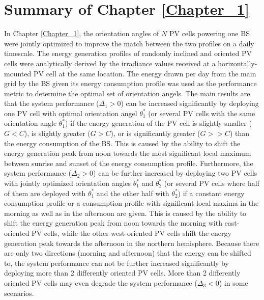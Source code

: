 \section{Summary of Chapter \ref{Chapter_1}\label{sum_Chapter_1}}
In Chapter \ref{Chapter_1}, the orientation angles of $N$ PV cells powering one BS were jointly optimized to improve the match between the two profiles on a daily timescale. The energy generation profiles of randomly inclined and oriented PV cells were analytically derived by the irradiance values received at a horizontally-mounted PV cell at the same location. The energy drawn per day from the main grid by the BS given its energy consumption profile was used as the performance metric to determine the optimal set of orientation angels.
The main results are that the system performance ($\Delta_1 > 0$) can be increased significantly by deploying one PV cell with optimal orientation angel $\theta_1^*$ (or several PV cells with the same orientation angle $\theta_1^*$) if the energy generation of the PV cell is slightly smaller ($G<C$), is slightly greater ($G>C$), or is significantly greater ($G>>C$) than the energy consumption of the BS. This is caused by the ability to shift the energy generation peak from noon towards the most significant local maximum between sunrise and sunset of the energy consumption profile. 
Furthermore, the system performance ($\Delta_2 > 0$) can be further increased by deploying two PV cells with jointly optimized orientation angles $\theta_1^*$ and $\theta_2^*$ (or several PV cells where half of them are deployed with $\theta_1^*$ and the other half with $\theta_2^*$) if a constant energy consumption profile or a consumption profile with significant local maxima in the morning as well as in the afternoon are given. This is caused by the ability to shift the energy generation peak from noon towards the morning with east-oriented PV cells, while the other west-oriented PV cells shift the energy generation peak towards the afternoon in the northern hemisphere. Because there are only two directions (morning and afternoon) that the energy can be shifted to, the system performance can not be further increased significantly by deploying more than 2 differently oriented PV cells. More than 2 differently oriented PV cells may even degrade the system performance ($\Delta_3 < 0$) in some scenarios.


